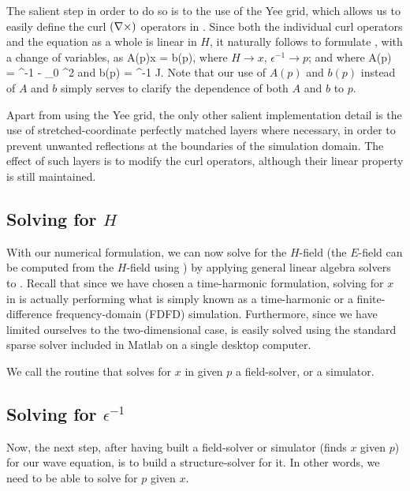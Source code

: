 The salient step in order to do so
    is to the use of the Yee grid, %
    which allows us to easily define the curl $(\nabla\times)$
    operators in . %
Since both the individual curl operators and the equation as a whole
    is linear in $H$, it naturally follows to formulate ,
    with a change of variables, as
\BE A(p)x = b(p), \label{eq:Ab} \EE 
    where $H \to x$, $\epsilon^{-1} \to p$; 
    and where
\BE A(p) = \curl \epsilon^{-1} \curl - \mu_0 \omega^2 \EE 
    and
\BE b(p) = \curl \epsilon^{-1} J. \EE
Note that our use of $A(p)$ and $b(p)$ instead of $A$ and $b$
    simply serves to clarify the dependence
    of both $A$ and $b$ to $p$.

Apart from using the Yee grid, the only other salient implementation detail
    is the use of
    stretched-coordinate perfectly matched layers %
    where necessary, in order to prevent unwanted reflections
    at the boundaries of the simulation domain.
The effect of such layers is to modify the curl operators,
    although their linear property is still maintained.

\subsection{Solving for $H$}
With our numerical formulation, we can now solve for the $H$-field
    (the $E$-field can be computed from the $H$-field using )
    by applying general linear algebra solvers to .
Recall that since we have chosen a time-harmonic formulation,
    solving for $x$ in  is actually performing what is simply known as
    a time-harmonic or a finite-difference frequency-domain (FDFD) simulation.
Furthermore, since we have limited ourselves to the two-dimensional case,
     is easily solved using the standard sparse solver
    included in Matlab on a single desktop computer.

We call the routine that solves for $x$ in  given $p$ a field-solver,
    or a simulator.
    


\subsection{Solving for $\epsilon^{-1}$}
Now, the next step,
    after having built a field-solver or simulator
    (finds $x$ given $p$) for our wave equation,
    is to build a structure-solver for it.
In other words, we need to be able to solve for $p$ given $x$.

